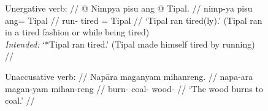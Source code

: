 \begin{figure}
\pex\label{ex:resitrns}
\a\label{ex:resitrns_unerg}\begingl
	\glpreamble Unergative verb: //
	\gla \excl{} @ Nimpya pisu ang @ Tipal. //
	\glb {} nimp-ya pisu ang= Tipal //
	\glc {} run-\TsgM{} tired \Aarg{}= Tipal //
	\glft `Tipal ran tired(ly).' (Tipal ran in a tired fashion or while being
		tired) \\
		\textit{Intended:} `*Tipal ran tired.' (Tipal made himself tired by
		running) //
\endgl

\a\label{ex:resitrns_unacc}\begingl
	\glpreamble Unaccusative verb: //
	\gla Napāra maganyam mihanreng. //
	\glb napa-ara magan-yam mihan-reng //
	\glc burn-\TsgI{} coal-\Dat{} wood-\AargI{} //
	\glft `The wood burns to coal.' //
\endgl

\xe
\end{figure}

